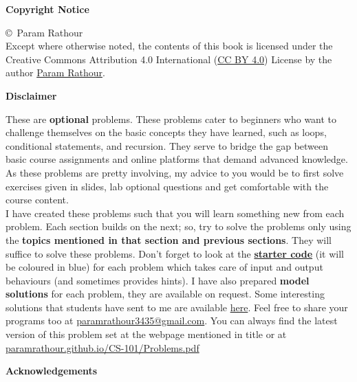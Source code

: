 \documentclass[../Problems]{subfiles}
\begin{document}
\begin{center}
	\textbf{\Large{Copyright Notice}}
\end{center}
\copyright\ Param Rathour\\
Except where otherwise noted, the contents of this book is licensed under the Creative Commons Attribution 4.0 International (\href{https://creativecommons.org/licenses/by/4.0/}{CC BY 4.0}) License by the author \href{https://paramrathour.github.io/}{Param Rathour}.
\begin{center}
	\textbf{\Large{Disclaimer}}
\end{center}
These are \textbf{optional} problems.
These problems cater to beginners who want to challenge themselves on the basic concepts they have learned, such as loops, conditional statements, and recursion. They serve to bridge the gap between basic course assignments and online platforms that demand advanced knowledge.
As these problems are pretty involving, my advice to you would be to first solve exercises given in slides, lab optional questions and get comfortable with the course content.\\
I have created these problems such that you will learn something new from each problem. Each section builds on the next; so, try to solve the problems only using the \textbf{topics mentioned in that section and previous sections}. They will suffice to solve these problems. Don't forget to look at the \href{https://github.com/paramrathour/CS-101/tree/main/Starter%20Codes}{\textbf{starter code}} (it will be coloured in blue) for each problem which takes care of input and output behaviours (and sometimes provides hints). I have also prepared \textbf{model solutions} for each problem, they are available on request. Some interesting solutions that students have sent to me are available \href{https://paramrathour.github.io/CS101/Solutions}{here}. Feel free to share your programs too at \href{mailto:paramrathour3435@gmail.com}{paramrathour3435@gmail.com}. You can always find the latest version of this problem set at the webpage mentioned in title or at \href{https://paramrathour.github.io/CS-101/Problems.pdf}{paramrathour.github.io/CS-101/Problems.pdf}
\begin{center}
	\textbf{\Large{Acknowledgements}}
\end{center}
\end{document}
